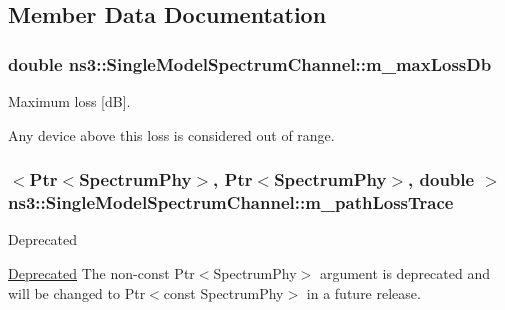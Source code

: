\subsection{Member Data Documentation}
\subsubsection[{\texorpdfstring{m\+\_\+max\+Loss\+Db}{m_maxLossDb}}]{\setlength{\rightskip}{0pt plus 5cm}double ns3\+::\+Single\+Model\+Spectrum\+Channel\+::m\+\_\+max\+Loss\+Db\hspace{0.3cm}{\ttfamily [private]}}\hypertarget{classns3_1_1SingleModelSpectrumChannel_a77e85736d9520060359b9d2f420c0747}{}\label{classns3_1_1SingleModelSpectrumChannel_a77e85736d9520060359b9d2f420c0747}
Maximum loss \mbox{[}dB\mbox{]}.

Any device above this loss is considered out of range. 
\subsubsection[{\texorpdfstring{m\+\_\+path\+Loss\+Trace}{m_pathLossTrace}}]{$<${\bf Ptr}$<${\bf Spectrum\+Phy}$>$, {\bf Ptr}$<${\bf Spectrum\+Phy}$>$, double $>$ ns3\+::\+Single\+Model\+Spectrum\+Channel\+::m\+\_\+path\+Loss\+Trace\hspace{0.3cm}{\ttfamily [private]}}\hypertarget{classns3_1_1SingleModelSpectrumChannel_ac20ae2c0f27bed879388820857b97599}{}\label{classns3_1_1SingleModelSpectrumChannel_ac20ae2c0f27bed879388820857b97599}
\begin{DoxyRefDesc}{Deprecated}
\item[\hyperlink{deprecated__deprecated000032}{Deprecated}]The non-\/const {\ttfamily Ptr$<$\+Spectrum\+Phy$>$} argument is deprecated and will be changed to {\ttfamily Ptr$<$const Spectrum\+Phy$>$} in a future release. \end{DoxyRefDesc}
